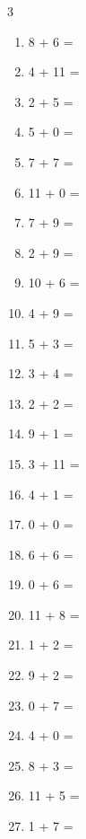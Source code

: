 \documentclass[a4paper, 11pt]{article}
\begin{document}
\begin{multicols}{3}
\begin{enumerate}
      \item 8 + 6 = \dotfill\bigskip
      \item 4 + 11 = \dotfill\bigskip
      \item 2 + 5 = \dotfill\bigskip
      \item 5 + 0 = \dotfill\bigskip
      \item 7 + 7 = \dotfill\bigskip
      \item 11 + 0 = \dotfill\bigskip
      \item 7 + 9 = \dotfill\bigskip
      \item 2 + 9 = \dotfill\bigskip
      \item 10 + 6 = \dotfill
      \item 4 + 9 = \dotfill\bigskip
      \item 5 + 3 = \dotfill\bigskip
      \item 3 + 4 = \dotfill\bigskip
      \item 2 + 2 = \dotfill\bigskip
      \item 9 + 1 = \dotfill\bigskip
      \item 3 + 11 = \dotfill\bigskip
      \item 4 + 1 = \dotfill\bigskip
      \item 0 + 0 = \dotfill\bigskip
      \item 6 + 6 = \dotfill\bigskip
      \item 0 + 6 = \dotfill\bigskip
      \item 11 + 8 = \dotfill\bigskip
      \item 1 + 2 = \dotfill\bigskip
      \item 9 + 2 = \dotfill\bigskip
      \item 0 + 7 = \dotfill\bigskip
      \item 4 + 0 = \dotfill\bigskip
      \item 8 + 3 = \dotfill\bigskip
      \item 11 + 5 = \dotfill\bigskip
      \item 1 + 7 = \dotfill
    \end{enumerate}
\end{multicols}
\end{document}
